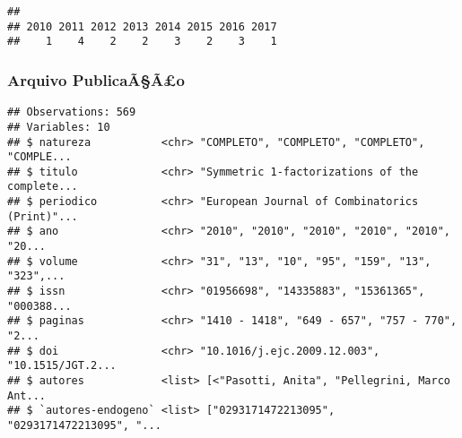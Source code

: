 \documentclass[]{article}
\newenvironment{Shaded}{\begin{snugshade}}{\end{snugshade}}
\newcommand{\KeywordTok}[1]{\textcolor[rgb]{0.13,0.29,0.53}{\textbf{#1}}}
\newcommand{\DecValTok}[1]{\textcolor[rgb]{0.00,0.00,0.81}{#1}}
\newcommand{\StringTok}[1]{\textcolor[rgb]{0.31,0.60,0.02}{#1}}
\newcommand{\CommentTok}[1]{\textcolor[rgb]{0.56,0.35,0.01}{\textit{#1}}}
\newcommand{\ControlFlowTok}[1]{\textcolor[rgb]{0.13,0.29,0.53}{\textbf{#1}}}
\newcommand{\OperatorTok}[1]{\textcolor[rgb]{0.81,0.36,0.00}{\textbf{#1}}}
\newcommand{\NormalTok}[1]{#1}
\begin{document}
\begin{verbatim}
## 
## 2010 2011 2012 2013 2014 2015 2016 2017 
##    1    4    2    2    3    2    3    1
\end{verbatim}

\subsubsection{Arquivo PublicaÃ§Ã£o}\label{arquivo-publicaaao}

\begin{Shaded}
\end{Shaded}

\begin{verbatim}
## Observations: 569
## Variables: 10
## $ natureza           <chr> "COMPLETO", "COMPLETO", "COMPLETO", "COMPLE...
## $ titulo             <chr> "Symmetric 1-factorizations of the complete...
## $ periodico          <chr> "European Journal of Combinatorics (Print)"...
## $ ano                <chr> "2010", "2010", "2010", "2010", "2010", "20...
## $ volume             <chr> "31", "13", "10", "95", "159", "13", "323",...
## $ issn               <chr> "01956698", "14335883", "15361365", "000388...
## $ paginas            <chr> "1410 - 1418", "649 - 657", "757 - 770", "2...
## $ doi                <chr> "10.1016/j.ejc.2009.12.003", "10.1515/JGT.2...
## $ autores            <list> [<"Pasotti, Anita", "Pellegrini, Marco Ant...
## $ `autores-endogeno` <list> ["0293171472213095", "0293171472213095", "...
\end{verbatim}
\end{document}
